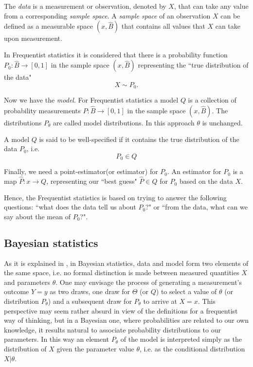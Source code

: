 \documentclass[onecolumn,           %
               showpacs,            %
               preprintnumbers,     %
               aps,                 %
               letterpaper,             %
               superscriptaddress,      %
               nofootinbib,         %
               tightenlines,        %
               floats,floatfix      %
               ,usenatbib,
               ]{revtex4-1}
\begin{document}
The \textit{data} is a measurement or observation, denoted by $X$, that can take any value from a corresponding \textit{sample space}. A \textit{sample space} of an observation $X$ can be defined as a measurable space $(x,\hat B)$ that contains all values that $X$ can take upon measurement.

In Frequentist statistics it is considered that there is a probability function $P_0:\hat B\rightarrow [0,1]$ in the sample space $(x,\hat B)$ representing the ``true distribution of the data"
\[X\sim P_0.\]

Now we have the \textit{model}. For Frequentist statistics a model $Q$ is a collection of probability measurements $P:\hat B\rightarrow[0,1]$ in the sample space $(x,\hat B)$. The distributions $P_\theta$ are called model distributions. In this approach $\theta$ is unchanged. 

A model $Q$ is said to be well-specified if it contains the true distribution of the data $P_0$, i.e.
\[P_0\in Q\]

Finally, we need a point-estimator(or estimator) for $P_0$. An estimator for $P_0$ is a map $\hat P:x\rightarrow Q$, representing our ``best guess" $\hat P\in Q$ for $P_0$ based on the data $X$.

Hence, the Frequentist statistics is based on trying to answer the following questions: ``what does the data tell us about $P_0$?" or ``from the data, what can we say about the mean of $P_0$?".

\subsection{Bayesian statistics}

As it is explained in \cite{bayeslecture}, in Bayesian statistics, data and model form two elements of the same space, i.e. no formal distinction is made between measured quantities $X$ and parameters $\theta$. One may envisage the process of generating a measurement's outcome $Y=y$ as two draws, one draw for $\Theta$ (or $Q$) to select a value of $\theta$ (or distribution $P_\theta$) and a subsequent draw for $P_\theta$ to arrive at $X=x$. This perspective may seem rather absurd in view of the definitions for a frequentist way of thinking, but in a Bayesian one, where probabilities are related to our own knowledge, it results natural to associate probability distributions to our parameters. In this way an element $P_\theta$ of the model is interpreted simply as the distribution of $X$ given the parameter value $\theta$, i.e. as the conditional distribution $X|\theta$.
\end{document}
